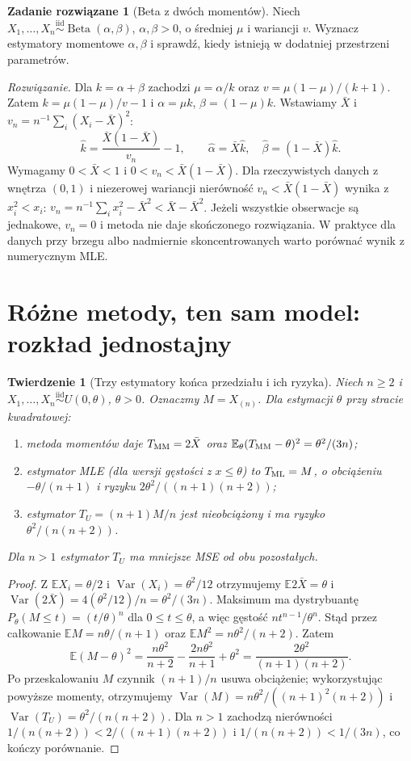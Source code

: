 \documentclass[11pt,a4paper,oneside]{report}
\numberwithin{equation}{chapter}
\theoremstyle{plain}
\newtheorem{twierdzenie}{Twierdzenie}[chapter]
\theoremstyle{definition}
\newtheorem{zadanie}{Zadanie rozwiązane}[chapter]
\theoremstyle{remark}
\newcommand{\E}{\mathbb E}
\newcommand{\Var}{\operatorname{Var}}
\newcommand{\iid}{\mathrel{\overset{\mathrm{iid}}\sim}}
\begin{document}
\begin{zadanie}[Beta z dwóch momentów]
\label{zad:beta-mom}
Niech $X_1,\ldots,X_n\iid\operatorname{Beta}(\alpha,\beta)$,
$\alpha,\beta>0$, o średniej $\mu$ i wariancji $v$.
Wyznacz estymatory momentowe $\alpha,\beta$ i sprawdź,
kiedy istnieją w dodatniej przestrzeni parametrów.
\par\emph{Rozwiązanie.} Dla $k=\alpha+\beta$ zachodzi
$\mu=\alpha/k$ oraz $v=\mu(1-\mu)/(k+1)$. Zatem
$k=\mu(1-\mu)/v-1$ i $\alpha=\mu k$, $\beta=(1-\mu)k$.
Wstawiamy $\bar X$ i $v_n=n^{-1}\sum_i(X_i-\bar X)^2$:
\[
\widehat k=\frac{\bar X(1-\bar X)}{v_n}-1,\qquad
\widehat\alpha=\bar X\widehat k,\quad
\widehat\beta=(1-\bar X)\widehat k.
\]
Wymagamy $0<\bar X<1$ i $0<v_n<\bar X(1-\bar X)$.
Dla rzeczywistych danych z wnętrza $(0,1)$ i niezerowej wariancji
nierówność $v_n<\bar X(1-\bar X)$ wynika z $x_i^2<x_i$:
$v_n=n^{-1}\sum_i x_i^2-\bar X^2<\bar X-\bar X^2$.
Jeżeli wszystkie obserwacje są jednakowe, $v_n=0$ i metoda nie
daje skończonego rozwiązania. W praktyce dla danych przy brzegu
albo nadmiernie skoncentrowanych warto porównać wynik z numerycznym MLE.
\end{zadanie}

\section{Różne metody, ten sam model: rozkład jednostajny}
\begin{twierdzenie}[Trzy estymatory końca przedziału i ich ryzyka]
\label{thm:uniform-comparison}
Niech $n\ge2$ i $X_1,\ldots,X_n\iid U(0,\theta)$, $\theta>0$.
Oznaczmy $M=X_{(n)}$. Dla estymacji $\theta$ przy stracie kwadratowej:
\begin{enumerate}
\item metoda momentów daje $T_{\rm MM}=2\bar X$ oraz
$\E_\theta(T_{\rm MM}-\theta)^2=\theta^2/(3n)$;
\item estymator MLE (dla wersji gęstości z $x\le\theta$) to
$T_{\rm ML}=M$, o obciążeniu $-\theta/(n+1)$ i ryzyku
$2\theta^2/((n+1)(n+2))$;
\item estymator $T_U=(n+1)M/n$ jest nieobciążony i ma ryzyko
$\theta^2/(n(n+2))$.
\end{enumerate}
Dla $n>1$ estymator $T_U$ ma mniejsze MSE od obu pozostałych.
\end{twierdzenie}
\begin{proof}
Z $\E X_i=\theta/2$ i $\Var(X_i)=\theta^2/12$
otrzymujemy $\E2\bar X=\theta$ i
$\Var(2\bar X)=4(\theta^2/12)/n=\theta^2/(3n)$.
Maksimum ma dystrybuantę $P_\theta(M\le t)=(t/\theta)^n$
dla $0\le t\le\theta$, a więc gęstość
$n t^{n-1}/\theta^n$. Stąd przez całkowanie
$\E M=n\theta/(n+1)$ oraz
$\E M^2=n\theta^2/(n+2)$. Zatem
\[
\E(M-\theta)^2=\frac{n\theta^2}{n+2}
-\frac{2n\theta^2}{n+1}+\theta^2
=\frac{2\theta^2}{(n+1)(n+2)}.
\]
Po przeskalowaniu $M$ czynnik $(n+1)/n$ usuwa obciążenie;
wykorzystując powyższe momenty, otrzymujemy
$\Var(M)=n\theta^2/((n+1)^2(n+2))$ i
$\Var(T_U)=\theta^2/(n(n+2))$.
Dla $n>1$ zachodzą nierówności
$1/(n(n+2))<2/((n+1)(n+2))$ i
$1/(n(n+2))<1/(3n)$, co kończy porównanie.
\end{proof}
\end{document}
